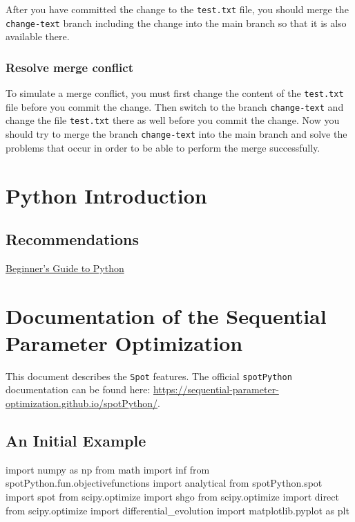 \documentclass[
  letterpaper,
  DIV=11,
  numbers=noendperiod]{scrreprt}
\newenvironment{Shaded}{\begin{snugshade}}{\end{snugshade}}
\newcommand{\ImportTok}[1]{\textcolor[rgb]{0.00,0.46,0.62}{#1}}
\newcommand{\NormalTok}[1]{\textcolor[rgb]{0.00,0.23,0.31}{#1}}
\begin{document}
After you have committed the change to the \texttt{test.txt} file, you
should merge the \texttt{change-text} branch including the change into
the main branch so that it is also available there.

\subsection{Resolve merge conflict}\label{resolve-merge-conflict}

To simulate a merge conflict, you must first change the content of the
\texttt{test.txt} file before you commit the change. Then switch to the
branch \texttt{change-text} and change the file \texttt{test.txt} there
as well before you commit the change. Now you should try to merge the
branch \texttt{change-text} into the main branch and solve the problems
that occur in order to be able to perform the merge successfully.

\chapter{Python Introduction}\label{python-introduction}

\section{Recommendations}\label{recommendations}

\href{https://wiki.python.org/moin/BeginnersGuide}{Beginner's Guide to
Python}

\chapter{Documentation of the Sequential Parameter
Optimization}\label{documentation-of-the-sequential-parameter-optimization}

This document describes the \texttt{Spot} features. The official
\texttt{spotPython} documentation can be found here:
\url{https://sequential-parameter-optimization.github.io/spotPython/}.

\section{An Initial Example}\label{an-initial-example}

\begin{Shaded}
\begin{Highlighting}[]
\ImportTok{import}\NormalTok{ numpy }\ImportTok{as}\NormalTok{ np}
\ImportTok{from}\NormalTok{ math }\ImportTok{import}\NormalTok{ inf}
\ImportTok{from}\NormalTok{ spotPython.fun.objectivefunctions }\ImportTok{import}\NormalTok{ analytical}
\ImportTok{from}\NormalTok{ spotPython.spot }\ImportTok{import}\NormalTok{ spot}
\ImportTok{from}\NormalTok{ scipy.optimize }\ImportTok{import}\NormalTok{ shgo}
\ImportTok{from}\NormalTok{ scipy.optimize }\ImportTok{import}\NormalTok{ direct}
\ImportTok{from}\NormalTok{ scipy.optimize }\ImportTok{import}\NormalTok{ differential\_evolution}
\ImportTok{import}\NormalTok{ matplotlib.pyplot }\ImportTok{as}\NormalTok{ plt}
\end{Highlighting}
\end{Shaded}
\end{document}
